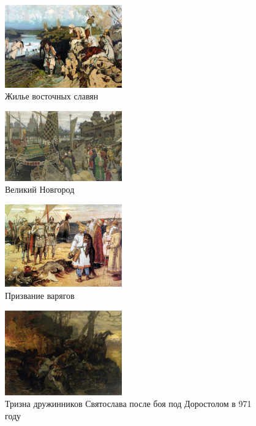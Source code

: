 \begin{figure}[ht]
    \centering
    \includegraphics[width=0.45\textwidth]{img/rus/Living_of_East_Slavs_by_Ivanov.jpg}
    \caption{Жилье восточных славян}
    \label{fig:slavs}
\end{figure}

\begin{figure}[ht]
    \centering
    \includegraphics[width=0.45\textwidth]{img/rus/novgorod.png}
    \caption{Великий Новгород}
    \label{fig:novrogod}
\end{figure}

\begin{figure}[ht]
    \centering
    \includegraphics[width=0.45\textwidth]{img/rus/1.jpg}
    \caption{Призвание варягов}
    \label{fig:summon}
\end{figure}

\begin{figure}[ht]
    \centering
    \includegraphics[width=0.45\textwidth]{img/rus/1afa34a7f984eeabdbb0a7d494132ee5_x1.png}
    \caption{Тризна дружинников Святослава после боя под Доростолом в 971 году}
    \label{fig:trizna}
\end{figure}

